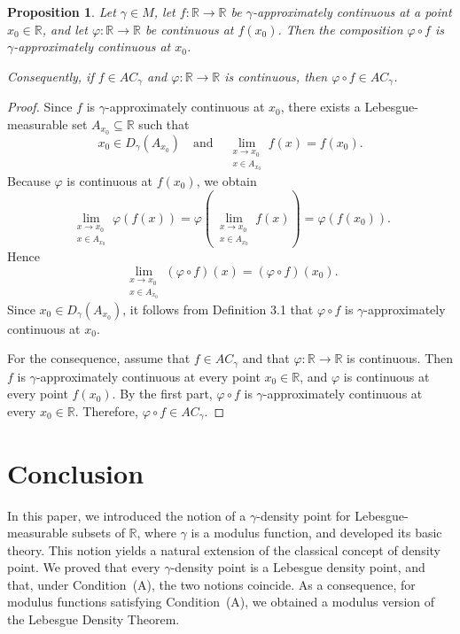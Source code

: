 \documentclass{amsart}
\theoremstyle{plain}
\newtheorem{proposition}{Proposition}
\numberwithin{equation}{section}
\begin{document}
\begin{proposition}
Let $\gamma \in M$, let $f:\mathbb{R}\to\mathbb{R}$ be $\gamma$-approximately continuous at a point
$x_{0}\in\mathbb{R}$, and let $\varphi:\mathbb{R}\to\mathbb{R}$ be continuous at $f(x_{0})$.
Then the composition $\varphi\circ f$ is $\gamma$-approximately continuous at $x_{0}$.

Consequently, if $f\in AC_{\gamma}$ and $\varphi:\mathbb{R}\to\mathbb{R}$ is continuous, then
$\varphi\circ f\in AC_{\gamma}$.
\end{proposition}

\begin{proof}
Since $f$ is $\gamma$-approximately continuous at $x_{0}$, there exists a Lebesgue-measurable set
$A_{x_{0}}\subseteq \mathbb{R}$ such that
$$
x_{0}\in D_{\gamma}(A_{x_{0}})
\quad\text{and}\quad
\lim_{\substack{x\to x_{0}\\ x\in A_{x_{0}}}} f(x)=f(x_{0}).
$$
Because $\varphi$ is continuous at $f(x_{0})$, we obtain
$$
\lim_{\substack{x\to x_{0}\\ x\in A_{x_{0}}}} \varphi(f(x))
=
\varphi\!\left(\lim_{\substack{x\to x_{0}\\ x\in A_{x_{0}}}} f(x)\right)
=
\varphi(f(x_{0})).
$$
Hence
$$
\lim_{\substack{x\to x_{0}\\ x\in A_{x_{0}}}} (\varphi\circ f)(x)
=
(\varphi\circ f)(x_{0}).
$$
Since $x_{0}\in D_{\gamma}(A_{x_{0}})$, it follows from Definition 3.1 that $\varphi\circ f$ is
$\gamma$-approximately continuous at $x_{0}$.

For the consequence, assume that $f\in AC_{\gamma}$ and that $\varphi:\mathbb{R}\to\mathbb{R}$ is
continuous. Then $f$ is $\gamma$-approximately continuous at every point $x_{0}\in\mathbb{R}$, and
$\varphi$ is continuous at every point $f(x_{0})$. By the first part, $\varphi\circ f$ is
$\gamma$-approximately continuous at every $x_{0}\in\mathbb{R}$. Therefore,
$\varphi\circ f\in AC_{\gamma}$.
\end{proof}

\section{Conclusion}
\label{Sec:3}


In this paper, we introduced the notion of a $\gamma$-density point for Lebesgue-measurable subsets of $\mathbb{R}$, where $\gamma$ is a modulus function, and developed its basic theory. This notion yields a natural extension of the classical concept of density point. We proved that every $\gamma$-density point is a Lebesgue density point, and that, under Condition~(A), the two notions coincide. As a consequence, for modulus functions satisfying Condition~(A), we obtained a modulus version of the Lebesgue Density Theorem.
\end{document}
